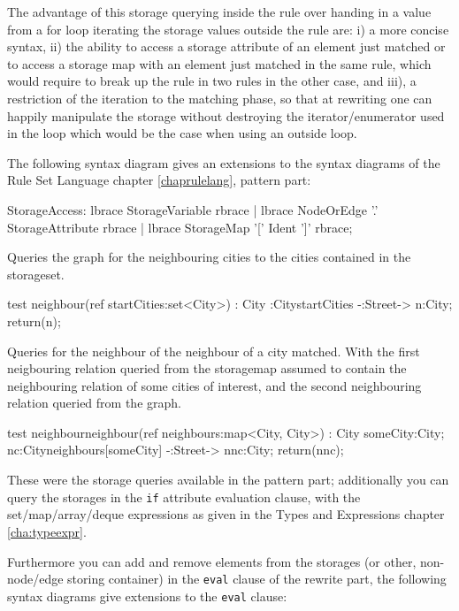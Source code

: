 The advantage of this storage querying inside the rule over handing in a value from a for loop iterating the storage values outside the rule are: i) a more concise syntax, ii) the ability to access a storage attribute of an element just matched or to access a storage map with an element just matched in the same rule, which would require to break up the rule in two rules in the other case, and iii), a restriction of the iteration to the matching phase, so that at rewriting one can happily manipulate the storage without destroying the iterator/enumerator used in the loop which would be the case when using an outside loop.

The following syntax diagram gives an extensions to the syntax diagrams of the Rule Set Language chapter \ref{chaprulelang}, pattern part:
\begin{rail}
  StorageAccess:
    lbrace StorageVariable rbrace |
    lbrace NodeOrEdge '.' StorageAttribute rbrace |
    lbrace StorageMap '[' Ident ']' rbrace;
\end{rail}

\begin{example}
Queries the graph for the neighbouring cities to the cities contained in the storageset.
\begin{grgen}
test neighbour(ref startCities:set<City>) : City
{
    :City{startCities} -:Street-> n:City;
    return(n);
}
\end{grgen}
\end{example}

\begin{example}
Queries for the neighbour of the neighbour of a city matched.
With the first neigbouring relation queried from the storagemap assumed to contain the neighbouring relation of some cities of interest, and the second neighbouring relation queried from the graph.
\begin{grgen}
test neighbourneighbour(ref neighbours:map<City, City>) : City
{
    someCity:City;
    nc:City{neighbours[someCity]} -:Street-> nnc:City;
    return(nnc);
}
\end{grgen}
\end{example}

These were the storage queries available in the pattern part;
additionally you can query the storages in the \texttt{if} attribute evaluation clause,
with the set/map/array/deque expressions as given in the Types and Expressions chapter \ref{cha:typeexpr}.

Furthermore you can add and remove elements from the storages (or other, non-node/edge storing container) in the \texttt{eval} clause of the rewrite part, the following syntax diagrams give extensions to the \texttt{eval} clause:

